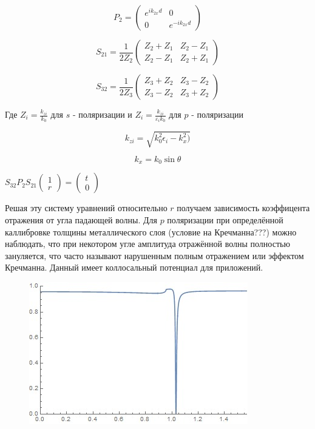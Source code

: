 $$P_{2}=\left(\begin{array}{cc}
e^{i k_{2 x} d} & 0 \\
0 & e^{-i k_{2 x} d}
\end{array}\right)$$



$$
S_{21} = 
\frac{1}{2 Z_2}\begin{pmatrix}
	Z_2+Z_1 & Z_2 -Z_1 \\
	Z_2-Z_1 & Z_2+Z_1
\end{pmatrix}
$$


$$
S_{32} = 
\frac{1}{2 Z_3}\begin{pmatrix}
Z_3+Z_2 & Z_3 -Z_2 \\
Z_3-Z_2 & Z_3+Z_2
\end{pmatrix}
$$

Где $Z_i = \frac{k_{zi}}{k_0}$ для $ s $ - поляризации и $Z_i = \frac{k_{zi}}{\varepsilon_i k_0}$ для $ p $ - поляризации 

$$
 k_{zi} = \sqrt{k_0^2 \epsilon_i - k_x^2)}
$$

$$
 k_{x} = k_0 \sin{ \theta}
$$


$
S_{32} P_2 S_{21} \begin{pmatrix}
	1\\
	r 
\end{pmatrix} = 
\begin{pmatrix}
t\\
0 
\end{pmatrix}
$


Решая эту систему уравнений относительно $ r $ получаем зависимость коэффицента отражения от угла падающей волны. Для $ p $ поляризации при определённой каллибровке толщины металлического слоя (условие на Кречманна???)
можно наблюдать, что при некотором угле амплитуда отражённой волны полностью зануляется, что часто называют нарушенным полным отражением или эффектом Кречманна.
Данный имеет коллосальный потенциал для приложений.

\begin{figure}[h!]
	\centering
	\includegraphics[width=0.7\linewidth]{kretchmann}
	\caption[Эффект Кречмана]{}
	\label{fig:kretchmann}
\end{figure}






